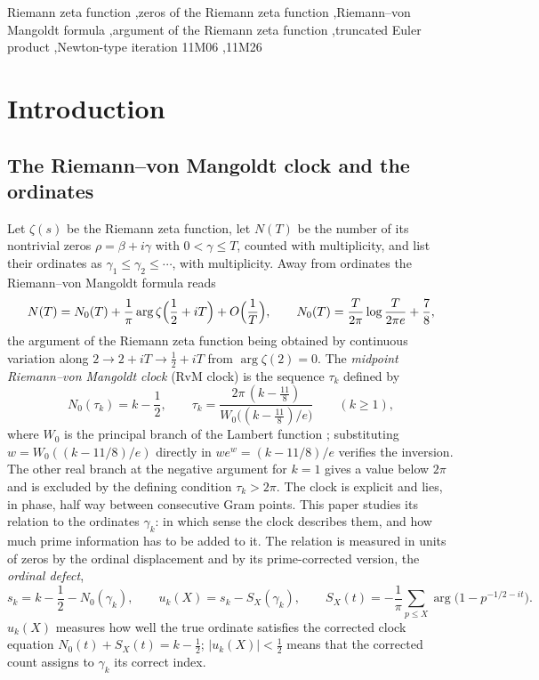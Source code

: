 \documentclass[preprint,12pt]{elsarticle}
\numberwithin{equation}{section}
\theoremstyle{plain}
\theoremstyle{definition}
\theoremstyle{remark}
\newcommand{\NO}{N_0}
\begin{document}
\begin{frontmatter}
\begin{keyword}
Riemann zeta function \sep zeros of the Riemann zeta function \sep Riemann--von Mangoldt formula \sep argument of the Riemann zeta function \sep truncated Euler product \sep Newton-type iteration
\MSC[2020] 11M06 \sep 11M26
\end{keyword}
\end{frontmatter}

\tableofcontents

\section{Introduction}
\label{sec:introduction}

\subsection{The Riemann--von Mangoldt clock and the ordinates}
\label{subsec:clock_intro}
Let $\zeta(s)$ be the Riemann zeta function, let $N(T)$ be the number of its nontrivial zeros $\rho=\beta+i\gamma$ with $0<\gamma\le T$, counted with multiplicity, and list their ordinates as $\gamma_1\le\gamma_2\le\cdots$, with multiplicity. Away from ordinates the Riemann--von Mangoldt formula reads \cite[\S\S9.3--9.4]{Titchmarsh1986}
\begin{equation}
 N(T)=\NO(T)+\frac1\pi\arg\zeta\Bigl(\frac12+iT\Bigr)+O\Bigl(\frac1T\Bigr),\qquad \NO(T)=\frac{T}{2\pi}\log\frac{T}{2\pi e}+\frac78,
 \label{eq:intro_rvm}
\end{equation}
the argument of the Riemann zeta function being obtained by continuous variation along $2\to2+iT\to\frac12+iT$ from $\arg\zeta(2)=0$. The \emph{midpoint Riemann--von Mangoldt clock} (RvM clock) is the sequence $\tau_k$ defined by
\begin{equation}
 \NO(\tau_k)=k-\frac12,\qquad \tau_k=\frac{2\pi\,(k-\frac{11}8)}{W_0\bigl((k-\frac{11}8)/e\bigr)}\qquad(k\ge1),
 \label{eq:intro_clock}
\end{equation}
where $W_0$ is the principal branch of the Lambert function \cite{Corless1996}; substituting $w=W_0((k-11/8)/e)$ directly in $we^w=(k-11/8)/e$ verifies the inversion. The other real branch at the negative argument for $k=1$ gives a value below $2\pi$ and is excluded by the defining condition $\tau_k>2\pi$. The clock is explicit and lies, in phase, half way between consecutive Gram points. This paper studies its relation to the ordinates $\gamma_k$: in which sense the clock describes them, and how much prime information has to be added to it. The relation is measured in units of zeros by the ordinal displacement and by its prime-corrected version, the \emph{ordinal defect},
\begin{equation}
 s_k=k-\frac12-\NO(\gamma_k),\qquad u_k(X)=s_k-S_X(\gamma_k),\qquad S_X(t)=-\frac1\pi\sum_{p\le X}\arg\bigl(1-p^{-1/2-it}\bigr).
 \label{eq:intro_defect}
\end{equation}
$u_k(X)$ measures how well the true ordinate satisfies the corrected clock equation $\NO(t)+S_X(t)=k-\frac12$; $|u_k(X)|<\frac12$ means that the corrected count assigns to $\gamma_k$ its correct index.
\end{document}
